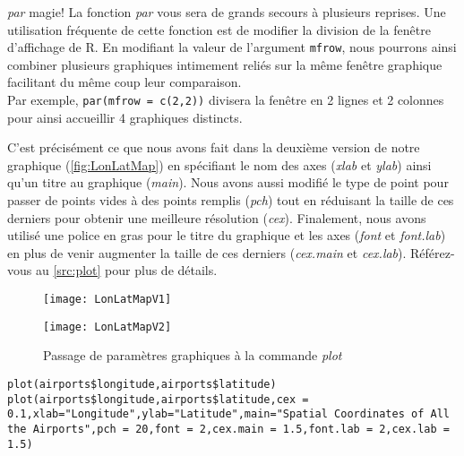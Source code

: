 \begin{moreInfo}{\emph{par} magie!}
	La fonction \emph{par} vous sera de grands secours à plusieurs reprises. Une utilisation fréquente de cette fonction est de modifier la division de la fenêtre d'affichage de R. En modifiant la valeur de l'argument \texttt{mfrow}, nous pourrons ainsi combiner plusieurs graphiques intimement reliés sur la même fenêtre graphique facilitant du même coup leur comparaison. \\
	Par exemple, \texttt{par(mfrow = c(2,2))} divisera la fenêtre en 2 lignes et 2 colonnes pour ainsi accueillir 4 graphiques distincts.
\end{moreInfo}

\noindent
C'est précisément ce que nous avons fait dans la deuxième version de notre graphique (\autoref{fig:LonLatMap}) en spécifiant le nom des axes (\emph{xlab} et \emph{ylab}) ainsi qu'un titre au graphique (\emph{main}). Nous avons aussi modifié le type de point pour passer de points vides à des points remplis (\emph{pch}) tout en réduisant la taille de ces derniers pour obtenir une meilleure résolution (\emph{cex}). Finalement, nous avons utilisé une police en gras pour le titre du graphique et les axes (\emph{font} et \emph{font.lab}) en plus de venir augmenter la taille de ces derniers (\emph{cex.main} et \emph{cex.lab}). Référez-vous au \autoref{src:plot} pour plus de détails. \\
	
\begin{figure}
	\begin{minipage}{\textwidth}
		\centering
		\texttt{[image: LonLatMapV1]}
	\end{minipage}
	\newline
	\begin{minipage}{\textwidth}
		\centering
		\texttt{[image: LonLatMapV2]}
	\end{minipage}
	\caption{Passage de paramètres graphiques à la commande \emph{plot}}
\end{figure}
\label{fig:LonLatMap}

\begin{lstlisting}[caption = Utilisation de la commande \emph{plot},label=src:plot]
plot(airports$longitude,airports$latitude)
plot(airports$longitude,airports$latitude,cex = 0.1,xlab="Longitude",ylab="Latitude",main="Spatial Coordinates of All the Airports",pch = 20,font = 2,cex.main = 1.5,font.lab = 2,cex.lab = 1.5)
\end{lstlisting}

